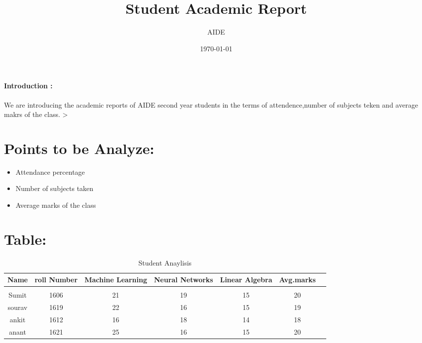 \documentclass{article}
\title{\textbf{Student Academic Report}}
\author{AIDE}
\date{\today}
\begin{document}
\maketitle
\paragraph{Introduction :}
We are introducing the academic reports of AIDE second year students in the terms of attendence,number of subjects teken and average makrs of the class. >
\section{Points to be Analyze:}
\begin{itemize}
    \item Attendance percentage
    \item Number of subjects taken
    \item Average marks of the class
\end{itemize}
\section{Table:}
\begin{table}[h]
    \centering
    \begin{tabular}{|c|c|c|c|c|C|c|}
    \hline
        Name & roll Number & Machine Learning & Neural Networks &Linear Algebra& Avg.marks  \\
          \hline \\
        Sumit &1606 &21&19&15&20 \\
          sourav &1619 &22&16&15 &19  \\
        ankit &1612 &16&18&14 &18  \\
        anant &1621 &25&16&15 &20  \\
        \hline
    \end{tabular}
    \caption{Student Anaylisis}
    \label{tab:my_label}
\end{table}
\end{document}
